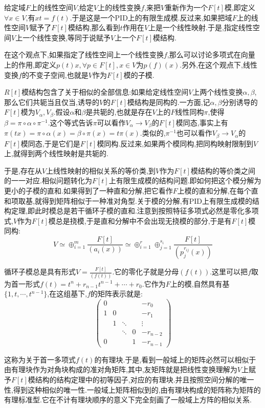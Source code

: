 给定域$F$上的线性空间$V$,给定$V$上的线性变换$f$,来把$V$重新作为一个$F[t]$模,即定义$\forall x\in V$,有$xt=f(t)$.于是这是一个PID上的有限生成模.反过来,如果把域$F$上的线性空间$V$赋予了$F[t]$模结构,那么看到$t$作用在$V$上是一个线性映射.于是,指定线性空间$V$上一个线性变换,等同于说赋予$V$上一个$F[t]$模结构.

在这个观点下,如果指定了线性空间上一个线性变换$f$,那么可以讨论多项式在向量上的作用,即定义$p(t)x,\forall p\in F[t],x\in V$为$p(f)(x)$.另外,在这个观点下,线性变换$f$的不变子空间,也就是$V$作为$F[t]$模的子模.

$R[t]$模结构包含了关于相似的全部信息:如果给定线性空间$V$上两个线性变换$\alpha,\beta$,那么它们共轭当且仅当,诱导的$V$的$F[t]$模结构是同构的.一方面,记$\alpha,\beta$分别诱导的$F[t]$模为$V_{\alpha},V_{\beta}$.假设$\alpha$和$\beta$是共轭的,也就是存在$V$上的$F$线性同构$\pi$,使得$\beta=\pi\circ\alpha\circ\pi^{-1}$.这个等式告诉$\pi$可以看作$V_{\alpha}\to V_{\beta}$的$F[t]$模同态,事实上有$\pi(tx)=\pi\circ\alpha(x)=\beta\circ\pi(x)=t\pi(x)$.类似的,$\pi^{-1}$也可以看作$V_{\beta}\to V_{\alpha}$的$F[t]$模同态,于是它们是$F[t]$模同构.反过来,如果两个模同构,把同构映射限制到$V$上,就得到两个线性映射是共轭的.

于是,存在从$V$上线性映射的相似关系的等价类,到$V$作为$F[t]$模结构的等价类之间的一一对应.相似问题转化为$F[t]$上有限生成模的结构问题.即如何把这个模分解为更小的子模的直和.如果得到了一种直和分解,把它看作$F$上模的直和分解,在每个直和项取基,就得到矩阵相似于一种准对角型.关于模的分解,有PID上有限生成模的结构定理,即此时模总是若干循环子模的直和.注意到按照特征多项式必然是零化多项式,$V$作为$F[t]$模总是挠模,于是直和分解中不会出现无挠模的部分,于是有$F[t]$模同构:
$$V\simeq\oplus_{i=1}^m\frac{F[t]}{(a_i(x))}\simeq\oplus_{i=1}^r\oplus_{j=1}^{s_i}\frac{F[t]}{(p_j^{r_{ij}}(x))}$$

循环子模总是具有形式$V=\frac{F[t]}{(f(t))}$.它的零化子就是分母$(f(t))$.这里可以把$f$取为首一形式$f(t)=t^n+r_{n-1}t^{n-1}+\cdots+r_0$.它作为$F$上的模,自然具有基$\{1,t,\cdots,t^{n-1}\}$,在这组基下,$f$的矩阵表示就是:
$$\left(\begin{array}{ccccc}
0&&&&-r_0\\
1&0&&&-r_1\\
&1&\ddots&&\vdots\\
&&\ddots&0&-r_{n-2}\\
0&&&1&-r_{n-1}\end{array}\right)$$

这称为关于首一多项式$f(t)$的有理块.于是,看到一般域上的矩阵必然可以相似于由有理块作为对角块构成的准对角矩阵,其中,友矩阵就是把线性变换理解为$V$上赋予$F[t]$模结构的结构定理中的初等因子,对应的有理块.并且按照空间分解的唯一性,得到这种相似的唯一性.一般域上矩阵相似到的,由有理块构成的矩阵称为矩阵的有理标准型.它在不计有理块顺序的意义下完全刻画了一般域上方阵的相似关系.


